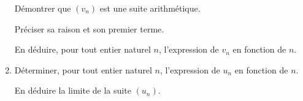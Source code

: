 \begin{enumerate}
Démontrer que $\left(v_n\right)$ est une suite arithmétique. 

Préciser sa raison et son premier terme. 

En déduire, pour tout entier naturel $n$, l'expression de $v_n$ en fonction de $n$.
\item Déterminer, pour tout entier naturel $n$, l'expression de $u_n$ en fonction de $n$.

En déduire la limite de la suite $\left(u_n\right)$.
\end{enumerate}

\bigskip

